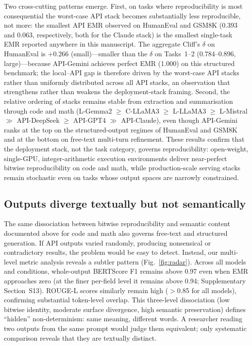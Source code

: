\documentclass[sn-nature]{sn-jnl}
\begin{document}
Two cross-cutting patterns emerge.
First, on tasks where reproducibility is most consequential the worst-case API stack becomes substantially less reproducible, not more: the smallest API EMR observed on HumanEval and GSM8K (0.393 and 0.063, respectively, both for the Claude stack) is the smallest single-task EMR reported anywhere in this manuscript. The aggregate Cliff's $\delta$ on HumanEval is $+0.266$ (small)---smaller than the $\delta$ on Tasks~1--2 (0.784--0.896, large)---because API-Gemini achieves perfect EMR (1.000) on this structured benchmark; the local--API gap is therefore driven by the worst-case API stacks rather than uniformly distributed across all API stacks, an observation that strengthens rather than weakens the deployment-stack framing.
Second, the relative ordering of stacks remains stable from extraction and summarisation through code and math (L-Gemma2 $\geq$ C-LLaMA3 $\geq$ L-LLaMA3 $\geq$ L-Mistral $\gg$ API-DeepSeek $\geq$ API-GPT4 $\gg$ API-Claude), even though API-Gemini ranks at the top on the structured-output regimes of HumanEval and GSM8K and at the bottom on free-text multi-turn refinement.
These results confirm that the deployment stack, not the task category, governs reproducibility: open-weight, single-GPU, integer-arithmetic execution environments deliver near-perfect bitwise reproducibility on code and math, while production-scale serving stacks remain stochastic even on tasks whose output spaces are narrowly constrained.


\subsection{Outputs diverge textually but not semantically}\label{subsec:semantic}

The same dissociation between bitwise reproducibility and semantic content documented above for code and math also governs free-text and structured generation. If API outputs varied randomly, producing nonsensical or contradictory results, the problem would be easy to detect.
Instead, our multi-level metric analysis reveals a subtler pattern (Fig.~\ref{fig:radar}).
Across all models and conditions, whole-output BERTScore F1 remains above 0.97 even when EMR approaches zero (at the finer per-field level it remains above 0.94; Supplementary Section~S13).
ROUGE-L scores similarly remain high ($>$0.85 for all models), confirming substantial token-level overlap.
This three-level dissociation (low bitwise identity, moderate surface divergence, high semantic preservation) defines ``hidden'' non-determinism: same meaning, different words.
A researcher reading two outputs from the same prompt would judge them equivalent; only systematic comparison reveals that they are textually distinct.
\end{document}
